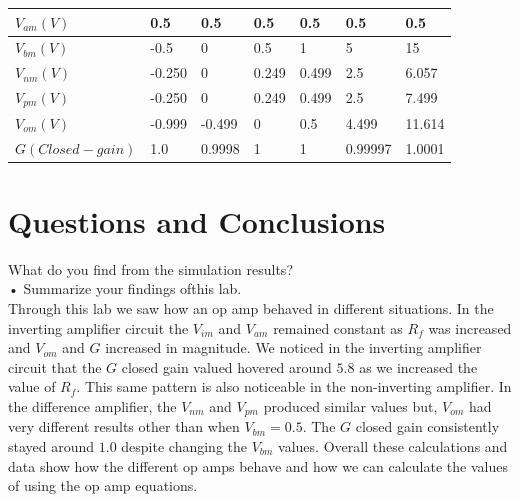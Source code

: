 \documentclass[a4paper]{article}
\newcommand\tab[1][0.5cm]{\hspace*{#1}}
\begin{document}
\begin{itemize}
\begin{tabular}{|l|l|l|l|l|l|l|}
	      	\hline
	      	$V_{am}(V)$      & 0.5    & 0.5    & 0.5   & 0.5   & 0.5     & 0.5    \\
	      	\hline
	      	$V_{bm}(V)$      & -0.5   & 0      & 0.5   & 1     & 5       & 15     \\
	      	\hline
	      	$V_{nm}(V)$      & -0.250 & 0      & 0.249 & 0.499 & 2.5     & 6.057  \\
	      	\hline
	      	$V_{pm}(V)$      & -0.250 & 0      & 0.249 & 0.499 & 2.5     & 7.499  \\
	      	\hline
	      	$V_{om}(V)$      & -0.999 & -0.499 & 0     & 0.5   & 4.499   & 11.614 \\
	      	\hline
	      	$G(Closed-gain)$ & 1.0    & 0.9998 & 1     & 1     & 0.99997 & 1.0001 \\
	      	\hline
	      \end{tabular}
\end{itemize}

\section*{Questions and Conclusions}
What do you find from the simulation results? \\
• Summarize your findings ofthis lab. \\
\tab Through this lab we saw how an op amp behaved in different situations. In the inverting amplifier circuit the $V_{im}$ and $V_{am}$ remained constant as $R_{f}$ was increased and  $V_{om}$ and $G$ increased in magnitude. We noticed in the inverting amplifier circuit that the $G$ closed gain valued hovered around $5.8$ as we increased the value of $R_{f}$. This same pattern is also noticeable in the non-inverting amplifier. In the difference amplifier, the $V_{nm}$ and $V_{pm}$ produced similar values but, $V_{om}$ had very different results other than when $V_{bm} = 0.5$. The $G$ closed gain consistently stayed around $1.0$ despite changing the $V_{bm}$ values. Overall these calculations and data show how the different op amps behave and how we can calculate the values of using the op amp equations. 
\end{document}

